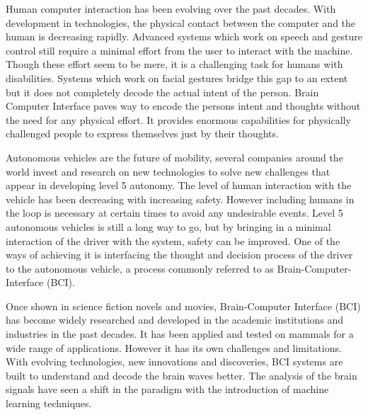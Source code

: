 Human computer interaction has been evolving over the past decades. With development in technologies, the physical contact between the computer and the human is decreasing rapidly. Advanced systems which work on speech and gesture control still require a minimal effort from the user to interact with the machine. Though these effort seem to be mere, it is a challenging task for humans with disabilities. Systems which work on facial gestures bridge this gap to an extent but it does not completely decode the actual intent of the person. Brain Computer Interface paves way to encode the persons intent and thoughts without the need for any physical effort. It provides enormous capabilities for physically challenged people to express themselves just by their thoughts. 

Autonomous vehicles are the future of mobility, several companies around the world invest and research on new technologies to solve new challenges that appear in developing level 5 autonomy. The level of human interaction with the vehicle has been decreasing with increasing safety. However including humans in the loop is necessary at certain times to avoid any undesirable events. Level 5 autonomous vehicles is still a long way to go, but by bringing in a minimal interaction of the driver with the system, safety can be improved. One of the ways of achieving it is interfacing the thought and decision process of the driver to the autonomous vehicle, a process commonly referred to as Brain-Computer-Interface (BCI). 

Once shown in science fiction novels and movies, Brain-Computer Interface (BCI) has become widely researched and developed in the academic institutions and industries in the past decades. It has been applied and tested on mammals for a wide range of applications. However it has its own challenges and limitations. With evolving technologies, new innovations and discoveries, BCI systems are built to understand and decode the brain waves better. The analysis of the brain signals have seen a shift in the paradigm with the introduction of machine learning techniques. 

